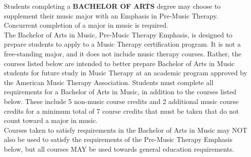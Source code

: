 \documentclass[
  letterpaper,
]{scrbook}
\begin{document}
Students completing a \textbf{BACHELOR OF ARTS} degree may choose to
supplement their music major with an Emphasis in Pre-Music Therapy.
Concurrent completion of a major in music is required.\\
The Bachelor of Arts in Music, Pre-Music Therapy Emphasis, is designed
to prepare students to apply to a Music Therapy certification program.
It is not a free-standing major, and it does not include music therapy
courses. Rather, the courses listed below are intended to better prepare
Bachelor of Arts in Music students for future study in Music Therapy at
an academic program approved by the American Music Therapy Association.
Students must complete all requirements for a Bachelor of Arts in Music,
in addition to the courses listed below. These include 5 non-music
course credits and 2 additional music course credits for a minimum total
of 7 course credits that must be taken that do not count toward a major
in music.\\
Courses taken to satisfy requirements in the Bachelor of Arts in Music
may NOT also be used to satisfy the requirements of the Pre-Music
Therapy Emphasis below, but all courses MAY be used towards general
education requirements.
\end{document}
